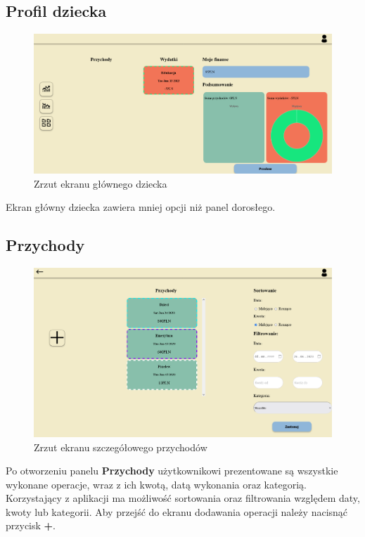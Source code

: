 \documentclass[12pt,a4paper,oneside]{article}
\begin{document}
\subsection{Profil dziecka}
\begin{figure}[H]
    \centering
    \includegraphics[width=\hsize,keepaspectratio]{images/childs_profile.png}
    \caption{Zrzut ekranu głównego dziecka}
\end{figure}
Ekran główny dziecka zawiera mniej opcji niż panel dorosłego.

\subsection{Przychody}
\begin{figure}[H]
    \centering
    \includegraphics[width=\hsize,keepaspectratio]{images/incomes_card.png}
    \caption{Zrzut ekranu szczegółowego przychodów}
\end{figure}
Po otworzeniu panelu \textbf{Przychody} użytkownikowi prezentowane są wszystkie
wykonane operacje, wraz z ich kwotą, datą wykonania oraz kategorią. Korzystający
z aplikacji ma możliwość sortowania oraz filtrowania względem daty, kwoty lub
kategorii. Aby przejść do ekranu dodawania operacji należy nacisnąć przycisk
\textbf{+}.
\end{document}
